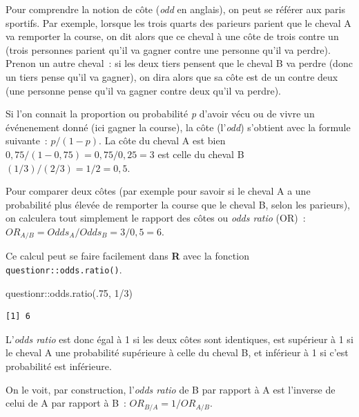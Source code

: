 \documentclass[
  letterpaper,
  DIV=11,
  numbers=noendperiod,
  oneside]{scrreprt}
\newenvironment{Shaded}{\begin{snugshade}}{\end{snugshade}}
\newcommand{\DecValTok}[1]{\textcolor[rgb]{0.68,0.00,0.00}{#1}}
\newcommand{\FunctionTok}[1]{\textcolor[rgb]{0.28,0.35,0.67}{#1}}
\newcommand{\NormalTok}[1]{\textcolor[rgb]{0.00,0.23,0.31}{#1}}
\newcommand{\SpecialCharTok}[1]{\textcolor[rgb]{0.37,0.37,0.37}{#1}}
\begin{document}
\begin{tcolorbox}[enhanced jigsaw, colbacktitle=quarto-callout-tip-color!10!white, opacityback=0, toprule=.15mm, colback=white, coltitle=black, bottomtitle=1mm, toptitle=1mm, titlerule=0mm, rightrule=.15mm, title=\textcolor{quarto-callout-tip-color}{\faLightbulb}\hspace{0.5em}{Astuce}, breakable, bottomrule=.15mm, opacitybacktitle=0.6, arc=.35mm, left=2mm, leftrule=.75mm, colframe=quarto-callout-tip-color-frame]

Pour comprendre la notion de côte (\emph{odd} en anglais), on peut se
référer aux paris sportifs. Par exemple, lorsque les trois quarts des
parieurs parient que le cheval A va remporter la course, on dit alors
que ce cheval à une côte de trois contre un (trois personnes parient
qu'il va gagner contre une personne qu'il va perdre). Prenon un autre
cheval~: si les deux tiers pensent que le cheval B va perdre (donc un
tiers pense qu'il va gagner), on dira alors que sa côte est de un contre
deux (une personne pense qu'il va gagner contre deux qu'il va perdre).

Si l'on connait la proportion ou probabilité \emph{p} d'avoir vécu ou de
vivre un événenement donné (ici gagner la course), la côte
(l'\emph{odd}) s'obtient avec la formule suivante~: \(p/(1-p)\). La côte
du cheval A est bien \(0,75/(1-0,75)=0,75/0,25=3\) est celle du cheval B
\((1/3)/(2/3)=1/2=0,5\).

Pour comparer deux côtes (par exemple pour savoir si le cheval A a une
probabilité plus élevée de remporter la course que le cheval B, selon
les parieurs), on calculera tout simplement le rapport des côtes ou
\emph{odds ratio} (OR)~: \(OR_{A/B}=Odds_{A}/Odds_{B}=3/0,5=6\).

Ce calcul peut se faire facilement dans \textbf{R} avec la fonction
\texttt{questionr::odds.ratio()}.

\begin{Shaded}
\begin{Highlighting}[]
\NormalTok{questionr}\SpecialCharTok{::}\FunctionTok{odds.ratio}\NormalTok{(.}\DecValTok{75}\NormalTok{, }\DecValTok{1}\SpecialCharTok{/}\DecValTok{3}\NormalTok{)}
\end{Highlighting}
\end{Shaded}

\begin{verbatim}
[1] 6
\end{verbatim}

L'\emph{odds ratio} est donc égal à 1 si les deux côtes sont identiques,
est supérieur à 1 si le cheval A une probabilité supérieure à celle du
cheval B, et inférieur à 1 si c'est probabilité est inférieure.

On le voit, par construction, l'\emph{odds ratio} de B par rapport à A
est l'inverse de celui de A par rapport à B~: \(OR_{B/A}=1/OR_{A/B}\).

\end{tcolorbox}
\end{document}
